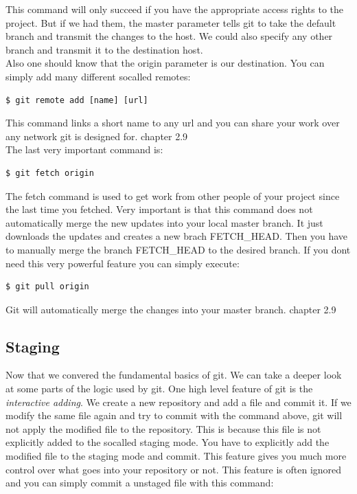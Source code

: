 This command will only succeed if you have the appropriate access rights to the
project. But if we had them, the master parameter tells git to take the default
branch and transmit the changes to the host. We could also specify any other
branch and transmit it to the destination host. \\ 

Also one should know that the origin parameter is our destination. You can
simply add many different socalled remotes:

\begin{lstlisting}
$ git remote add [name] [url]
\end{lstlisting}

This command links a short name to any url and you can share your
work over any network git is designed for. \cite{gitpro2009} chapter 2.9 \\

The last very important command is:
\begin{lstlisting}
$ git fetch origin
\end{lstlisting}

The fetch command is used to get work from other people of your project since
the last time you fetched. Very important is that this command does not
automatically merge the new updates into your local master branch. It just
downloads the updates and creates a new brach FETCH\_HEAD. Then you have to
manually merge the branch FETCH\_HEAD to the desired branch. 
If you dont need this very powerful feature you can simply execute:
\begin{lstlisting}
$ git pull origin
\end{lstlisting}
Git will automatically merge the changes into your master branch.
\cite{gitpro2009} chapter 2.9 \\

\subsection {Staging}

Now that we convered the fundamental basics of git. We can take a deeper look at
some parts of the logic used by git. One high level feature of git is the
\emph{interactive adding}. We create a new repository and add a file and commit
it. If we modify the same file again and try to commit with the command above,
git will not apply the modified file to the repository. This is because this file is
not explicitly added to the socalled staging mode. You have to explicitly add
the modified file to the staging mode and commit. This feature gives you much
more control over what goes into your repository or not. This feature is often
ignored and you can simply commit a unstaged file with this command:


